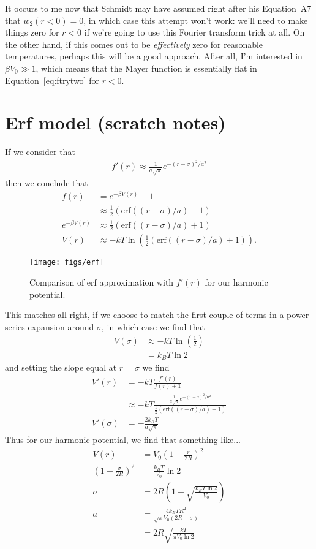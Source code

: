 \documentclass[letterpaper,twocolumn,amsmath,amssymb,prb]{revtex4-1}
\begin{document}
It occurs to me now that Schmidt may have assumed right after his
Equation~A7 that $w_2(r<0)=0$, in which case this attempt won't work:
we'll need to make things zero for $r<0$ if we're going to use this
Fourier transform trick at all.  On the other hand, if this comes out
to be \emph{effectively} zero for reasonable temperatures, perhaps
this will be a good approach.  After all, I'm interested in $\beta V_0
\gg 1$, which means that the Mayer function is essentially flat in
Equation~\ref{eq:ftrytwo} for $r<0$.

\section{Erf model (scratch notes)}
If we consider that
\begin{align}
  f'(r) \approx \frac{1}{a\sqrt{\pi}} e^{-(r-\sigma)^2/a^2}
\end{align}
then we conclude that
\begin{align}
  f(r) &= e^{-\beta V(r)} - 1 \\
  &\approx \tfrac12 ( \mathrm{erf}((r-\sigma)/a) - 1 ) \\
  e^{-\beta V(r)} &\approx \tfrac12 ( \mathrm{erf}((r-\sigma)/a) + 1 ) \\
  V(r) &\approx -kT\ln\left(\tfrac12 ( \mathrm{erf}((r-\sigma)/a) + 1 )\right).
\end{align}
\begin{figure}
  \texttt{[image: figs/erf]}
  \caption{Comparison of erf approximation with $f'(r)$ for our
    harmonic potential.}
\end{figure}
This matches all right, if we choose to match the first couple of
terms in a power series expansion around $\sigma$, in which case we
find that
\begin{align}
  V(\sigma) &\approx -kT\ln\left(\tfrac12\right) \\
  &= k_BT \ln 2
\end{align}
and setting the slope equal at $r=\sigma$ we find
\begin{align}
  V'(r) &= -kT \frac{f'(r)}{f(r)+1} \\
  &\approx -kT \frac{\frac{1}{a\sqrt{\pi}} e^{-(r-\sigma)^2/a^2}}{\tfrac12 ( \mathrm{erf}((r-\sigma)/a) + 1 )}
  \\
  V'(\sigma) &= -\frac{2k_BT}{a\sqrt{\pi}}
\end{align}
Thus for our harmonic potential, we find that something like...
\begin{align}
  V(r) &= V_0 \left(1-\frac{r}{2R}\right)^2\\
  \left(1 - \frac{\sigma}{2R}\right)^2 &= \frac{k_BT}{V_0}\ln 2 \\
  \sigma &= 2R\left( 1 - \sqrt{\frac{k_BT \ln 2}{V_0}}\right) \\
  a &= \frac{4k_BTR^2}{\sqrt{\pi}V_0(2R-\sigma)} \\
  &= 2R\sqrt{\frac{kT}{\pi V_0 \ln 2}}
\end{align}
\end{document}

